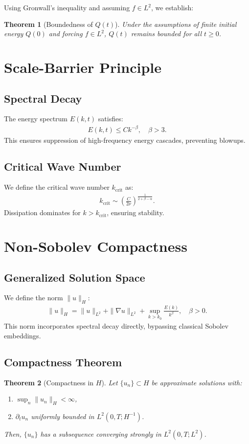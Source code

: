 \documentclass[12pt]{article}
\newtheorem{theorem}{Theorem}
\begin{document}
Using Gronwall's inequality and assuming $f \in L^2$, we establish:
\begin{theorem}[Boundedness of $Q(t)$]
Under the assumptions of finite initial energy $Q(0)$ and forcing $f \in L^2$, $Q(t)$ remains bounded for all $t \geq 0$.
\end{theorem}

\section{Scale-Barrier Principle}
\subsection{Spectral Decay}
The energy spectrum $E(k,t)$ satisfies:
\begin{align}
E(k,t) \leq C k^{-\beta}, \quad \beta > 3. \label{spectral_decay}
\end{align}
This ensures suppression of high-frequency energy cascades, preventing blowups.

\subsection{Critical Wave Number}
We define the critical wave number $k_{\text{crit}}$ as:
\begin{align}
k_{\text{crit}} \sim \left(\frac{C}{2\nu}\right)^{\frac{1}{2+\beta-\alpha}}.
\end{align}
Dissipation dominates for $k > k_{\text{crit}}$, ensuring stability.

\section{Non-Sobolev Compactness}
\subsection{Generalized Solution Space}
We define the norm $\|u\|_H$:
\begin{align}
\|u\|_H = \|u\|_{L^2} + \|\nabla u\|_{L^2} + \sup_{k>k_0} \frac{E(k)}{k^\beta}, \quad \beta > 0.
\end{align}
This norm incorporates spectral decay directly, bypassing classical Sobolev embeddings.

\subsection{Compactness Theorem}
\begin{theorem}[Compactness in $H$]
Let $\{u_n\} \subset H$ be approximate solutions with:
\begin{enumerate}
    \item $\sup_n \|u_n\|_H < \infty$,
    \item $\partial_t u_n$ uniformly bounded in $L^2(0,T;H^{-1})$.
\end{enumerate}
Then, $\{u_n\}$ has a subsequence converging strongly in $L^2(0,T;L^2)$.
\end{theorem}
\end{document}
